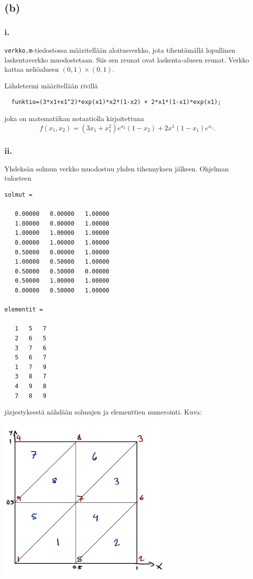 \documentclass{article}
\begin{document}
\subsection*{(b)}

\subsubsection*{i.}

\verb#verkko.m#-tiedostossa määritellään aloitusverkko, jota tihentämällä
lopullinen laskentaverkko muodostetaan. Siis sen reunat ovat laskenta-alueen
reunat. Verkko kattaa neliöalueen $(0, 1) \times (0, 1)$.

Lähdetermi määritellään rivillä
\begin{verbatim}
  funktio=(3*x1+x1^2)*exp(x1)*x2*(1-x2) + 2*x1*(1-x1)*exp(x1);
\end{verbatim}
joka on matematiikan notaatiolla kirjoitettuna
\[
  f(x_1,x_2) = (3x_1 + x_1^2)e^{x_2}(1-x_2) + 2x^1(1-x_1)e^{x_1}.
\]

\subsubsection*{ii.}

Yhdeksän solmun verkko muodostuu yhden tihennyksen jälkeen.
Ohjelman tulosteen
\begin{verbatim}
solmut =

   0.00000   0.00000   1.00000
   1.00000   0.00000   1.00000
   1.00000   1.00000   1.00000
   0.00000   1.00000   1.00000
   0.50000   0.00000   1.00000
   1.00000   0.50000   1.00000
   0.50000   0.50000   0.00000
   0.50000   1.00000   1.00000
   0.00000   0.50000   1.00000

elementit =

   1   5   7
   2   6   5
   3   7   6
   5   6   7
   1   7   9
   3   8   7
   4   9   8
   7   8   9
\end{verbatim}
järjestyksestä nähdään solmujen ja elementtien numerointi.
Kuva:

\includegraphics[width=250pt]{exam_5_ii.jpg}
\end{document}
